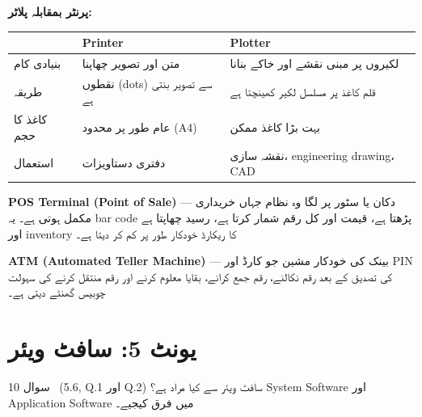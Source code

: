 \begin{hal}
\textbf{پرنٹر بمقابلہ پلاٹر:}
\begin{center}
\begin{tabular}{@{}p{2.4cm} p{5.8cm} p{6.0cm}@{}}
\toprule
 & \textbf{\textenglish{Printer}} & \textbf{\textenglish{Plotter}} \\
\midrule
بنیادی کام & متن اور تصویر چھاپنا & لکیروں پر مبنی نقشے اور خاکے بنانا \\
طریقہ & نقطوں (\textenglish{dots}) سے تصویر بنتی ہے & قلم کاغذ پر مسلسل لکیر کھینچتا ہے \\
کاغذ کا حجم & عام طور پر محدود (\textenglish{A4}) & بہت بڑا کاغذ ممکن \\
استعمال & دفتری دستاویزات & نقشہ سازی، \textenglish{engineering drawing}، \textenglish{CAD} \\
\bottomrule
\end{tabular}
\end{center}

\medskip
\textbf{\textenglish{POS Terminal} (\textenglish{Point of Sale})} --- دکان یا
سٹور پر لگا وہ نظام جہاں خریداری مکمل ہوتی ہے۔ یہ \textenglish{bar code}
پڑھتا ہے، قیمت اور کل رقم شمار کرتا ہے، رسید چھاپتا ہے اور
\textenglish{inventory} کا ریکارڈ خودکار طور پر کم کر دیتا ہے۔

\medskip
\textbf{\textenglish{ATM} (\textenglish{Automated Teller Machine})} --- بینک کی
خودکار مشین جو کارڈ اور \textenglish{PIN} کی تصدیق کے بعد رقم نکالنے، رقم جمع
کرانے، بقایا معلوم کرنے اور رقم منتقل کرنے کی سہولت چوبیس گھنٹے دیتی ہے۔

\end{hal}

\section*{یونٹ \textenglish{5}: سافٹ ویئر}

\begin{sawal}{سوال \textenglish{10} \ \textnormal{\small(\textenglish{5.6, Q.1} اور \textenglish{Q.2})}}
سافٹ ویئر سے کیا مراد ہے؟ \textenglish{System Software} اور
\textenglish{Application Software} میں فرق کیجیے۔
\end{sawal}

